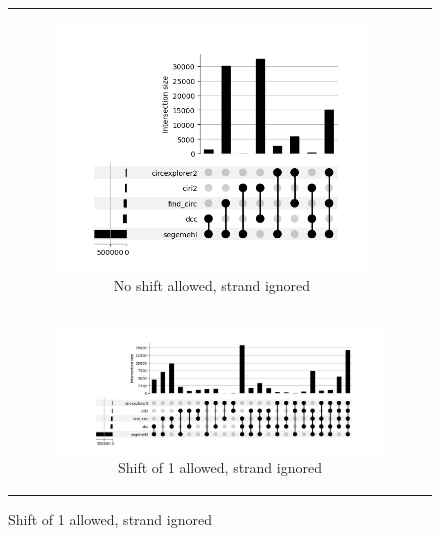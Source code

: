 \begin{figure}[ht]
\begin{tabular}{cc}
\begin{subfigure}{.5\textwidth}
            \includegraphics[width=\linewidth]{chapters/4_results_and_discussion/figures/detection/upset/diff_0_nostrand.png}
            \caption{No shift allowed, strand ignored}
            \label{fig:detection_upset_nostrand}
        \end{subfigure} \\
        \multicolumn{2}{c}{
            \begin{subfigure}{\textwidth}
                \centering

                \includegraphics[width=\linewidth]{chapters/4_results_and_discussion/figures/detection/upset/diff_1_nostrand.png}
                \caption{Shift of 1 allowed, strand ignored}
                \label{fig:detection_upset_microshift}


\end{subfigure}}
\end{tabular}
\end{figure}

